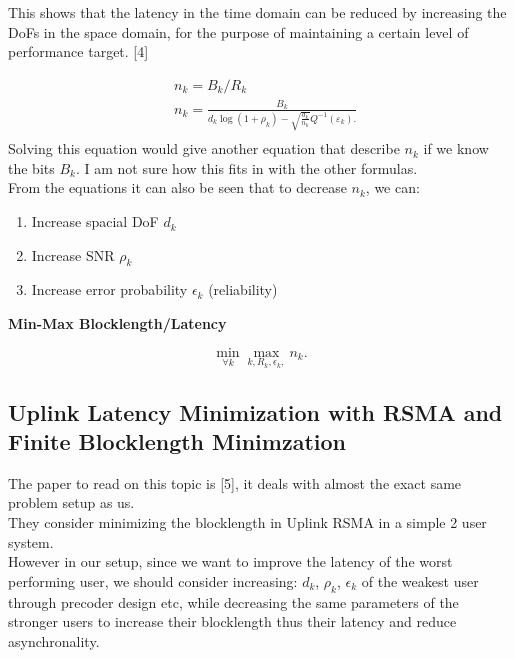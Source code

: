 \documentclass[a4paper, 12pt, onecolumn, journal, twoside, draftclsnofoot]{IEEEtran}
\begin{document}
This shows that the latency in the time domain can be reduced by increasing the DoFs in the space domain, for the purpose of maintaining a certain level of performance target. [4] 

\begin{equation*}
\begin{split}
    &n_k = B_k/R_k \\
    &n_k = \frac{B_k}{d_k\log\left(1+\rho_k\right)-\sqrt{\frac{d_k}{n_k}}Q^{-1}\left(\varepsilon_k\right).}\\
\end{split}
\end{equation*}
Solving this equation would give another equation that describe $n_k$ if we know the bits $B_k$. I am not sure how this fits in with the other formulas.\\

From the equations it can also be seen that to decrease $n_k$, we can:
\begin{enumerate}
    \item Increase spacial DoF $d_k$
    \item Increase SNR $\rho_k$
    \item Increase error probability $\epsilon_k$ (reliability)
\end{enumerate}

\textbf{Min-Max Blocklength/Latency}

\begin{equation*}
    \min_{\forall k}  \max_{k,R_k,\epsilon_k, }  n_k. 
\end{equation*}

\subsection{Uplink Latency Minimization with RSMA and Finite Blocklength Minimzation}

The paper to read on this topic is [5], it deals with almost the exact same problem setup as us. \\
They consider minimizing the blocklength in Uplink RSMA in a simple 2 user system. \\

However in our setup, since we want to improve the latency of the worst performing user, we should consider increasing: $d_k$, $\rho_k$, $\epsilon_k$ of the weakest user through precoder design etc, while decreasing the same parameters of the stronger users to increase their blocklength thus their latency and reduce asynchronality. \\
\end{document}
